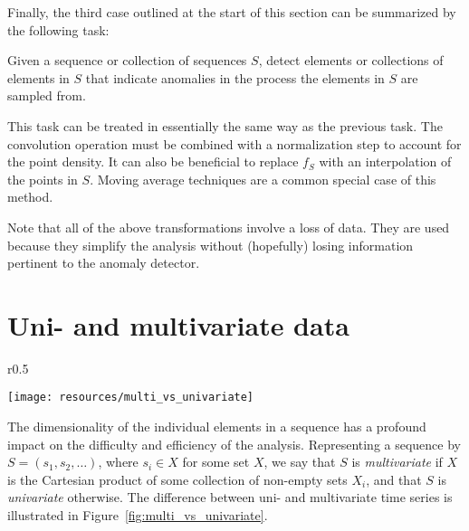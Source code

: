 Finally, the third case outlined at the start of this section can be summarized by the following task:

\begin{task}
\label{task:continuous_anomaly_detection}
  Given a sequence or collection of sequences $S$, detect elements or collections of elements in $S$ that indicate anomalies in the process the elements in $S$ are sampled from.
\end{task}

This task can be treated in essentially the same way as the previous task. The convolution operation must be combined with a normalization step to account for the point density. It can also be beneficial to replace $f_S$ with an interpolation of the points in $S$. Moving average techniques are a common special case of this method.

Note that all of the above transformations involve a loss of data. They are used because they simplify the analysis without (hopefully) losing information pertinent to the anomaly detector.

\section{Uni- and multivariate data}
\label{sect:unimultivariate}

\begin{wrapfigure}{r}{0.5\textwidth}
    \vspace{-25pt}
    \begin{center}
        \leavevmode
        \texttt{[image: resources/multi\_vs\_univariate]}
    \end{center}
    \vspace{-15pt}
    \caption{{\small Two sine curves regarded as two separate univariate time series (dotted lines) and as one multivariate time series (solid lines).}}
\label{fig:multi_vs_univariate}
    \vspace{-25pt}
\end{wrapfigure}

The dimensionality of the individual elements in a sequence has a profound impact on the difficulty and efficiency of the analysis. Representing a sequence by $S = (s_1, s_2, \dots)$, where $s_i \in X$ for some set $X$, we say that $S$ is \emph{multivariate} if $X$ is the Cartesian product of some collection of non-empty sets $X_i$, and that $S$ is \emph{univariate} otherwise. The difference between uni- and multivariate time series is illustrated in Figure~\ref{fig:multi_vs_univariate}.

